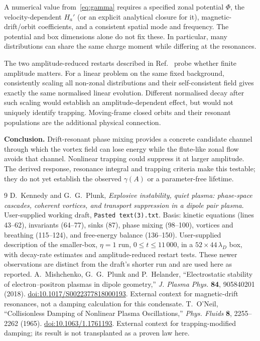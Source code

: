\documentclass[10pt,a4paper]{article}
\begin{document}
A numerical value from~\eqref{eq:gamma} requires a specified zonal potential $\Phi$, the velocity-dependent $H_a'$ (or an explicit analytical closure for it), magnetic-drift/orbit coefficients, and a consistent spatial mode and frequency. The potential and box dimensions alone do not fix these. In particular, many distributions can share the same charge moment while differing at the resonances.

The two amplitude-reduced restarts described in Ref.~\cite{longrun} probe whether finite amplitude matters. For a linear problem on the same fixed background, consistently scaling all non-zonal distributions and their self-consistent field gives exactly the same normalised linear evolution. Different normalised decay after such scaling would establish an amplitude-dependent effect, but would not uniquely identify trapping. Moving-frame closed orbits and their resonant populations are the additional physical connection.

\begin{tcolorbox}
\textbf{Conclusion.} Drift-resonant phase mixing provides a concrete candidate channel through which the vortex field can lose energy while the flute-like zonal flow avoids that channel. Nonlinear trapping could suppress it at larger amplitude. The derived response, resonance integral and trapping criteria make this testable; they do not yet establish the observed $\gamma(A)$ or a parameter-free lifetime.
\end{tcolorbox}

\begingroup
\small
\renewcommand{\refname}{Sources and scope}
\begin{thebibliography}{9}
\setlength{\itemsep}{3pt}
D.~Kennedy and G.~G.~Plunk,
\emph{Explosive instability, quiet plasma: phase-space cascades, coherent vortices, and transport suppression in a dipole pair plasma}.
User-supplied working draft, \texttt{Pasted text(3).txt}.
Basis: kinetic equations (lines 43--62), invariants (64--77), sinks (87), phase mixing (98--100), vortices and breathing (115--124), and free-energy balance (136--150).
User-supplied description of the smaller-box, $\eta=1$ run, $0\leq t\leq11\,000$, in a $52\times44\,\lambda_D$ box, with decay-rate estimates and amplitude-reduced restart tests. These newer observations are distinct from the draft's shorter run and are used here as reported.
A.~Mishchenko, G.~G.~Plunk and P.~Helander,
``Electrostatic stability of electron--positron plasmas in dipole geometry,''
\emph{J. Plasma Phys.} \textbf{84}, 905840201 (2018).
\href{https://doi.org/10.1017/S0022377818000193}{doi:10.1017/S0022377818000193}.
External context for magnetic-drift resonances, not a damping calculation for this condensate.
T.~O'Neil, ``Collisionless Damping of Nonlinear Plasma Oscillations,''
\emph{Phys. Fluids} \textbf{8}, 2255--2262 (1965).
\href{https://doi.org/10.1063/1.1761193}{doi:10.1063/1.1761193}.
External context for trapping-modified damping; its result is not transplanted as a proven law here.
\end{thebibliography}
\endgroup
\end{document}
